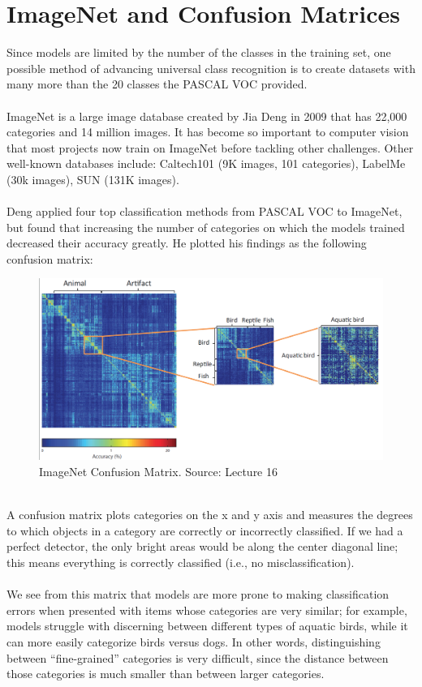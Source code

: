 \documentclass[11pt]{article}
\begin{document}
\section{ImageNet and Confusion Matrices}
Since models are limited by the number of the classes in the training set, one possible method of advancing universal class recognition is to create datasets with many more than the 20 classes the PASCAL VOC provided. \\ \\
ImageNet is a large image database created by Jia Deng in 2009 that  has 22,000 categories and 14 million images. It has become so important to computer vision that most projects now train on ImageNet before tackling other challenges. Other well-known databases include: Caltech101 (9K images, 101 categories), LabelMe (30k images), SUN (131K images).\\ \\
Deng applied four top classification methods from PASCAL VOC to ImageNet, but found that increasing the number of categories on which the models trained decreased their accuracy greatly. He plotted his findings as the following confusion matrix: \\
\begin{figure}[h]
  \centering
  \includegraphics[scale=0.6]{confusionmatrix.png}
  \caption{ImageNet Confusion Matrix. Source: Lecture 16}
\end{figure}\\
A confusion matrix plots categories on the x and y axis and measures the degrees to which objects in a category are correctly or incorrectly classified. If we had a perfect detector, the only bright areas would be along the center diagonal line; this means everything is correctly classified (i.e., no misclassification).\\ \\
We see from this matrix that models are more prone to making classification errors when presented with items whose categories are very similar; for example, models struggle with discerning between different types of aquatic birds, while it can more easily categorize birds versus dogs. In other words, distinguishing between ``fine-grained'' categories is very difficult, since the distance between those categories is much smaller than between larger categories.
\end{document}
